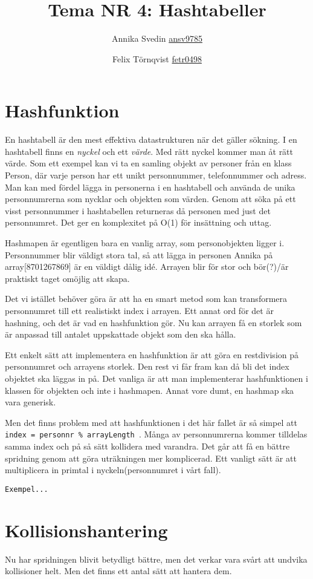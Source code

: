 \documentclass[a5paper,10pt,oneside]{article}
\title{Tema NR 4: Hashtabeller}
\author{Annika Svedin \url{ansv9785} \and Felix Törnqvist \url{fetr0498}}
\begin{document}
\maketitle
\section*{Hashfunktion}


En hashtabell är den mest effektiva datastrukturen när det gäller sökning. I en hashtabell finns en  \emph{nyckel} och ett  \emph{värde}. Med rätt nyckel kommer man åt rätt värde. Som ett exempel kan vi ta en samling objekt av personer från en klass Person, där varje person har ett unikt personnummer, telefonnummer och adress.
Man kan med fördel lägga in personerna i en hashtabell och använda de unika personnumrerna som nycklar och objekten som värden. Genom att söka på ett visst personnummer i hashtabellen returneras då personen med just det personnumret. Det ger en komplexitet på O(1) för insättning och uttag.

Hashmapen är egentligen bara en vanlig array, som personobjekten ligger i. Personnummer blir väldigt stora tal, så att lägga in personen Annika på array[8701267869] är en väldigt dålig idé. Arrayen blir för stor och bör(?)/är praktiskt taget omöjlig att skapa.

Det vi istället behöver göra är att ha en smart metod som kan transformera personnumret till ett realistiskt index i arrayen. Ett annat ord för det är hashning, och det är vad en hashfunktion gör.
Nu kan arrayen få en storlek som är anpassad till antalet uppskattade objekt som den ska hålla.

Ett enkelt sätt att implementera en hashfunktion är att göra en restdivision på personnumret och arrayens storlek. Den rest vi får fram kan då bli det index objektet ska läggas in på.
Det vanliga är att man implementerar hashfunktionen i klassen för objekten och inte i hashmapen. Annat vore dumt, en hashmap ska vara generisk.

Men det finns problem med att hashfunktionen i det här fallet är så simpel att  \texttt{index = personnr \%  arrayLength }. Många av personnumrerna kommer tilldelas samma index och på så sätt kollidera med varandra. Det går att få en bättre spridning genom att göra uträkningen mer komplicerad. Ett vanligt sätt är att multiplicera in primtal i nyckeln(personnumret i vårt fall). 

\texttt{Exempel...}


\section*{Kollisionshantering}
Nu har spridningen blivit betydligt bättre, men det verkar vara svårt att undvika kollisioner helt. Men det finns ett antal sätt att hantera dem.
\end{document}
